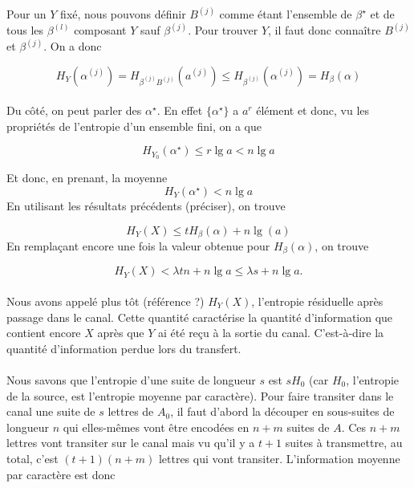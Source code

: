 	\paragraph{}
	Pour un $Y$ fixé, nous pouvons définir $B^{(j)}$ comme étant l'ensemble de
	$\beta^\star$ et de tous les $\beta^{(l)}$ composant $Y$ sauf 
	$\beta^{(j)}$. Pour trouver $Y$, il faut donc connaître $B^{(j)}$ 
	et $\beta^{(j)}$. On a 	donc
	
	\[
		H_Y(\alpha^{(j)}) = H_{\beta^{(j)}B^{(j)}}\left(a^{(j)}\right) \le 
		H_{\beta^{(j)}}\left(\alpha^{(j)}\right)=H_\beta(\alpha)
	\]
	
	\paragraph{}
	Du côté, on peut parler des $\alpha^\star$. En effet $\{\alpha^\star\}$ a 
	$a^r$ élément et donc, vu les propriétés de l'entropie d'un ensemble fini,
	on a que
	
	\[H_{Y_0}(\alpha^\star) \le r\lg a < n\lg a\]
	
	Et donc, en prenant, la moyenne 
	\[H_Y(\alpha^\star) < n \lg a\]
	En utilisant les résultats précédents (préciser), on trouve
	
	\[H_Y(X)\le t H_\beta(\alpha) + n \lg(a)\]
	En remplaçant encore une fois la valeur obtenue pour $H_\beta(\alpha)$, 
	on trouve
	
	\[H_Y(X)<\lambda t n + n \lg a \le \lambda s+n \lg a.\]
	
	\paragraph{}
	Nous avons appelé plus tôt (référence ?) $H_Y(X)$, l'entropie résiduelle 
	après passage dans le canal. Cette quantité caractérise la quantité 
	d'information que contient encore $X$ après que $Y$ ai été reçu à la 
	sortie du canal. C'est-à-dire la quantité d'information perdue lors 
	du transfert.
	
	\paragraph{}
	Nous savons que l'entropie d'une suite de longueur $s$ est $sH_0$ 
	(car $H_0$, l'entropie de la source, est l'entropie moyenne par caractère). 
	Pour faire transiter dans le canal une suite de $s$ lettres de $A_0$,
	il faut d'abord la découper en sous-suites de longueur $n$ qui 
	elles-mêmes vont être encodées en $n+m$ suites de $A$. Ces $n+m$ lettres
	vont transiter sur le canal mais vu qu'il y a $t+1$ suites à 
	transmettre, au total, c'est $(t+1)(n+m)$ lettres qui vont transiter. 
	L'information moyenne par caractère est donc
	
